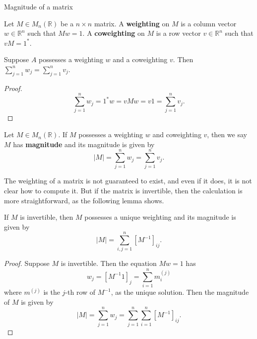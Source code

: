 \documentclass[12pt,mathserif]{beamer}
\begin{document}
\begin{frame}[allowframebreaks]{Magnitude of a matrix}

\begin{definition}
Let $M \in M_n(\mathbb{R})$ be a $n\times n$ matrix. A \textbf{weighting} on $M$ is a column vector $w\in\mathbb{R}^n$ such that $Mw = 1$. A \textbf{coweighting} on $M$ is a row vector $v\in\mathbb{R}^n$ such that $vM = 1^\ast$.
\end{definition}

\framebreak

\begin{lemma}
Suppose $A$ possesses a weighting $w$ and a coweighting $v$. Then $\sum\limits_{j=1}^n w_j = \sum\limits_{j=1}^n v_j$.
\end{lemma}

\begin{proof}
\begin{equation*}
\sum\limits_{j=1}^nw_j = 1^\ast w = vMw = v1 = \sum\limits_{j=1}^nv_j.
\end{equation*}
\end{proof}

\framebreak

\begin{definition}
Let $M \in M_n(\mathbb{R})$. If $M$ possesses a weighting $w$ and coweighting $v$, then we say $M$ has \textbf{magnitude} and its magnitude is given by
\begin{equation*}
\vert M \vert = \sum\limits_{j=1}^nw_j = \sum\limits_{j=1}^nv_j.
\end{equation*}
\end{definition}

The weighting of a matrix is not guaranteed to exist, and even if it does, it is not clear how to compute it. But if the matrix is invertible, then the calculation is more straightforward, as the following lemma shows.

\framebreak

\begin{lemma}\label{lem:invertible}
If $M$ is invertible, then $M$ possesses a unique weighting and its magnitude is given by
\begin{equation*}
\vert M \vert = \sum\limits_{i,j=1}^n\left[M^{-1}\right]_{ij}.
\end{equation*}
\end{lemma}

\framebreak

\begin{proof}
Suppose $M$ is invertible. Then the equation $Mw = 1$
has
\begin{equation*}
w_j = \left[M^{-1}1\right]_j = \sum\limits_{i=1}^n m^{(j)}_i
\end{equation*}
where $m^{(j)}$ is the $j$-th row of $M^{-1}$, as the unique solution. Then the magnitude of $M$ is given by
\begin{equation*}
\vert M \vert = \sum\limits_{j=1}^n w_j = \sum\limits_{j=1}^n\sum\limits_{i=1}^n \left[M^{-1}\right]_{ij}.
\end{equation*}
\end{proof}

\end{frame}
\end{document}
